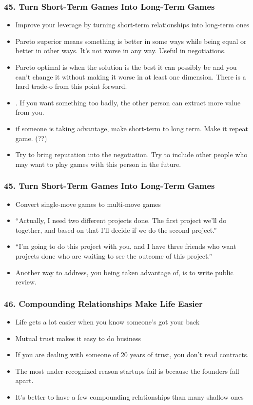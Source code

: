 \begin{frame}[fragile]
\frametitle{45. Turn Short-Term Games Into Long-Term Games}
\begin{itemize}
\item Improve your leverage by turning short-term relationships into long-term ones
\item Pareto superior means something is better in some ways while being equal or better in other ways. It’s
not worse in any way. Useful in negotiations.
\item Pareto optimal is when the solution is the best it can possibly be and you can’t change it without making
it worse in at least one dimension. There is a hard trade-o  from this point forward.
\item . If you want something too badly, the other person can extract more value from you.
\item if someone is taking advantage, make short-term to long term. Make it repeat game. (??)
\item  Try to bring reputation into the negotiation.
Try to include other people who may want to play games with this person in the future.
\end{itemize}
\end{frame}

\begin{frame}[fragile]
\frametitle{45. Turn Short-Term Games Into Long-Term Games}
\begin{itemize}
\item Convert single-move games to multi-move games
\item  “Actually, I need two different projects done. The  first project we’ll do
together, and based on that I’ll decide if we do the second project.”
\item  “I’m going to do this project with you, and I have three friends who want projects
done who are waiting to see the outcome of this project.”
\item Another way to address, you being taken advantage of, is to write public review.
\end{itemize}
\end{frame}


\begin{frame}[fragile]
\frametitle{46. Compounding Relationships Make Life Easier}
\begin{itemize}
\item Life gets a lot easier when you know someone’s got your back
\item Mutual trust makes it easy to do business
\item If you are dealing with someone of 20 years of trust, you don't read contracts.
\item The most under-recognized reason startups fail is because the founders fall apart.
\item It’s better to have a few compounding relationships than many shallow ones
\end{itemize}
\end{frame}

